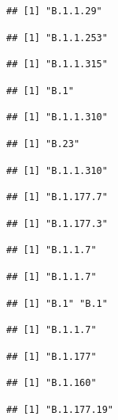 \documentclass[]{article}
\begin{document}
\begin{verbatim}
## [1] "B.1.1.29"
\end{verbatim}

\begin{verbatim}
## [1] "B.1.1.253"
\end{verbatim}

\begin{verbatim}
## [1] "B.1.1.315"
\end{verbatim}

\begin{verbatim}
## [1] "B.1"
\end{verbatim}

\begin{verbatim}
## [1] "B.1.1.310"
\end{verbatim}

\begin{verbatim}
## [1] "B.23"
\end{verbatim}

\begin{verbatim}
## [1] "B.1.1.310"
\end{verbatim}

\begin{verbatim}
## [1] "B.1.177.7"
\end{verbatim}

\begin{verbatim}
## [1] "B.1.177.3"
\end{verbatim}

\begin{verbatim}
## [1] "B.1.1.7"
\end{verbatim}

\begin{verbatim}
## [1] "B.1.1.7"
\end{verbatim}

\begin{verbatim}
## [1] "B.1" "B.1"
\end{verbatim}

\begin{verbatim}
## [1] "B.1.1.7"
\end{verbatim}

\begin{verbatim}
## [1] "B.1.177"
\end{verbatim}

\begin{verbatim}
## [1] "B.1.160"
\end{verbatim}

\begin{verbatim}
## [1] "B.1.177.19"
\end{verbatim}
\end{document}
